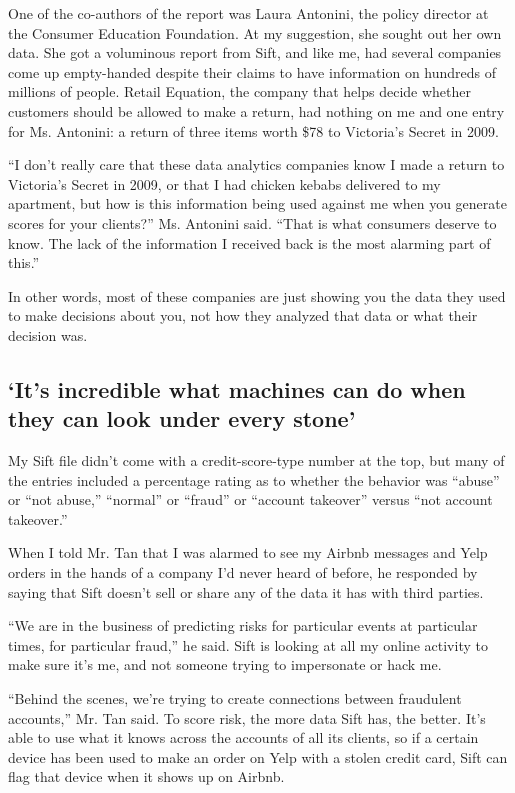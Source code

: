 One of the co-authors of the report was Laura Antonini, the policy
director at the Consumer Education Foundation. At my suggestion, she
sought out her own data. She got a voluminous report from Sift, and like
me, had several companies come up empty-handed despite their claims to
have information on hundreds of millions of people. Retail Equation, the
company that helps decide whether customers should be allowed to make a
return, had nothing on me and one entry for Ms. Antonini: a return of
three items worth \$78 to Victoria's Secret in 2009.

``I don't really care that these data analytics companies know I made a
return to Victoria's Secret in 2009, or that I had chicken kebabs
delivered to my apartment, but how is this information being used
against me when you generate scores for your clients?'' Ms. Antonini
said. ``That is what consumers deserve to know. The lack of the
information I received back is the most alarming part of this.''

In other words, most of these companies are just showing you the data
they used to make decisions about you, not how they analyzed that data
or what their decision was.

\hypertarget{its-incredible-what-machines-can-do-when-they-can-look-under-every-stone}{%
\subsection{`It's incredible what machines can do when they can look
under every
stone'}\label{its-incredible-what-machines-can-do-when-they-can-look-under-every-stone}}

My Sift file didn't come with a credit-score-type number at the top, but
many of the entries included a percentage rating as to whether the
behavior was ``abuse'' or ``not abuse,'' ``normal'' or ``fraud'' or
``account takeover'' versus ``not account takeover.''

When I told Mr. Tan that I was alarmed to see my Airbnb messages and
Yelp orders in the hands of a company I'd never heard of before, he
responded by saying that Sift doesn't sell or share any of the data it
has with third parties.

``We are in the business of predicting risks for particular events at
particular times, for particular fraud,'' he said. Sift is looking at
all my online activity to make sure it's me, and not someone trying to
impersonate or hack me.

``Behind the scenes, we're trying to create connections between
fraudulent accounts,'' Mr. Tan said. To score risk, the more data Sift
has, the better. It's able to use what it knows across the accounts of
all its clients, so if a certain device has been used to make an order
on Yelp with a stolen credit card, Sift can flag that device when it
shows up on Airbnb.

